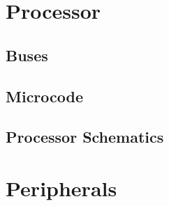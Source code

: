 




\renewcommand{\thepage}{\Alph{part}\arabic{chapter}-\arabic{page}}
\renewcommand{\thefigure}{\Alph{part}\arabic{chapter}.\arabic{figure}}
\renewcommand{\theschematic}{\Alph{part}\arabic{chapter}.\arabic{schematic}}
\renewcommand{\thetable}{\Alph{part}\arabic{chapter}.\arabic{schematic}}
\renewcommand{\thepage}{\thepart\thechapter-\arabic{page}}

\ifdefined\renderpartprocessor
  \part{Processor}
  \glsresetall

  

  \chapter{Buses}
  \glsresetall
  

  \chapter{Microcode}
  \glsresetall
  \label{chap:microcode}
  

  \chapter{Processor Schematics}
  \glsresetall
  \label{chap:processor-schematics}
  
  
\fi

\ifdefined\renderpartperipherals
\part{Peripherals}
  \ifdefined\renderchappfp
